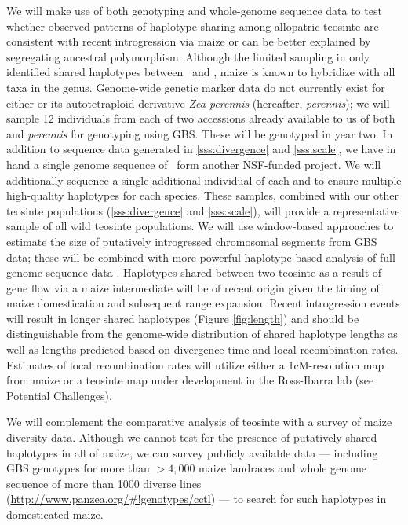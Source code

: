 We will make use of both genotyping and whole-genome sequence data to test whether observed patterns of haplotype sharing among allopatric teosinte are consistent with recent introgression via maize or can be better explained by segregating ancestral polymorphism.
Although the limited sampling in \citet{Ross-Ibarra2009a} only identified shared haplotypes between \zm\ and \zl, maize is known to hybridize with all taxa in the genus.
Genome-wide genetic marker data do not currently exist for either \zd{} or its autotetraploid derivative \emph{Zea perennis} (hereafter, \emph{perennis}); we will sample 12 individuals from each of two accessions already available to us of both \zd{} and \emph{perennis} for genotyping using GBS. 
These will be genotyped in year two.
In addition to sequence data generated in \ref{sss:divergence} and \ref{sss:scale}, we have in hand a single genome sequence of \zd\ form another NSF-funded project.  
We will additionally sequence a single additional individual of each \zd{} and \zl{} to ensure multiple high-quality haplotypes for each species.
These samples, combined with our other teosinte populations (\ref{sss:divergence} and \ref{sss:scale}), will provide a representative sample of all wild teosinte populations.
We will use window-based approaches \citep[e.g.,][]{martin2015evaluating} to estimate the size of putatively introgressed chromosomal segments from GBS data; these will be combined with more powerful haplotype-based analysis of full genome sequence data \citep{price2009}.  
Haplotypes shared between two teosinte as a result of gene flow via a maize intermediate will be of recent origin given the timing of maize domestication and subsequent range expansion. 
Recent introgression events will result in longer shared haplotypes (Figure \ref{fig:length}) and should be distinguishable from the genome-wide distribution of shared haplotype lengths as well as lengths predicted based on divergence time and local recombination rates.  
Estimates of local recombination rates will utilize either a 1cM-resolution map from maize \citep{wallace2014association} or a teosinte map under development in the Ross-Ibarra lab (see Potential Challenges).

We will complement the comparative analysis of teosinte with a survey of maize diversity data.
Although we cannot test for the presence of putatively shared haplotypes in all of maize, we can survey publicly available data --- including GBS genotypes for more than $>4,000$ maize landraces \citep{Hearne2015} and whole genome sequence of more than 1000 diverse lines (\url{http://www.panzea.org/#!genotypes/cctl}) --- to search for such haplotypes in domesticated maize.

